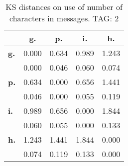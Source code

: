 \begin{table}[h!]
\begin{center}
\begin{tabular}{| l || c | c | c | c |}\hline
 & {\bf g.} & {\bf p.} & {\bf i.} & {\bf h.} \\\hline\hline
{\bf g.} & 0.000 & 0.634 & 0.989 & 1.243 \\
{\bf } & 0.000 & 0.046 & 0.060 & 0.074 \\\hline
{\bf p.} & 0.634 & 0.000 & 0.656 & 1.441 \\
{\bf } & 0.046 & 0.000 & 0.055 & 0.119 \\\hline
{\bf i.} & 0.989 & 0.656 & 0.000 & 1.844 \\
{\bf } & 0.060 & 0.055 & 0.000 & 0.133 \\\hline
{\bf h.} & 1.243 & 1.441 & 1.844 & 0.000 \\
{\bf } & 0.074 & 0.119 & 0.133 & 0.000 \\\hline
\end{tabular}
\caption{KS distances on use of number of characters in messages. TAG: 2}
\end{center}
\end{table}
